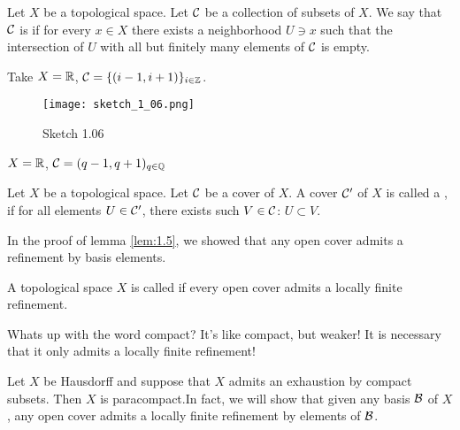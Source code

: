 \begin{definition*}\label{def:local_finiteness}
    Let \(X\) be a topological space. Let \(\mathcal{C}\) be a collection of subsets of \(X\). We say that \(\mathcal{C}\) 
    is  if for every \(x\in X\) there exists a neighborhood \(U\ni x\) such that 
    the intersection of \(U\) with all but finitely many elements of \(\mathcal{C}\) is empty.
\end{definition*}

\begin{example}
    Take \(X=\mathbb{R}\), \(\mathcal{C}=\{(i-1,i+1)\}_{i\in\mathbb{Z}}\).
    \begin{figure}[H]
        \centering
        \texttt{[image: sketch\_1\_06.png]}
        \caption{Sketch 1.06}
    \end{figure}
\end{example}

\begin{example}
    \(X=\mathbb{R}\), \(\mathcal{C}=(q-1,q+1)_{q\in\mathbb{Q}}\)
\end{example}

\begin{definition*}\label{def:refinement}
    Let \(X\) be a topological space. Let \(\mathcal{C}\) be a cover of \(X\). A cover \(\mathcal{C}'\) of \(X\) is called a 
    , if for all elements \(U\in\mathcal{C}'\), there exists such \(V\in\mathcal{C}\): \(U\subset V\).
\end{definition*}

\begin{example}
   In the proof of lemma \ref{lem:1.5}, we showed that any open cover admits a refinement by basis elements. 
\end{example}

\begin{definition*}
    A topological space \(X\) is called  if every open cover admits a locally finite refinement.
\end{definition*}

Whats up with the word compact? It's like compact, but weaker! It is necessary that it only admits a locally finite refinement!

\begin{lemma}\label{lem:1.7}
    Let \(X\) be Hausdorff and suppose that \(X\) admits an exhaustion by compact subsets. Then 
    \(X\) is paracompact.In fact, we will show that given any basis \(\mathcal{B}\) of \(X\), any open cover 
    admits a locally finite refinement by elements of \(\mathcal{B}\).
\end{lemma}

